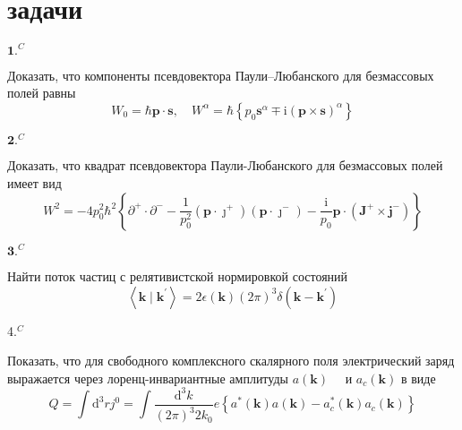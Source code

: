 \documentclass[a4paper,12pt]{article} %
\begin{document}
\section{задачи}


\begin{ttask}$\mathbf{1.}^{C}$ 

Доказать, что компоненты псевдовектора Паули–Любанского для
безмассовых полей равны
$$
W_{0}=\hbar \boldsymbol{p} \cdot \boldsymbol{s}, \quad 
W^{\alpha}=\hbar\left\{p_{0} \boldsymbol{s}^{\alpha} \mp \mathrm{i}(\boldsymbol{p} \times \boldsymbol{s})^{\alpha}\right\}
$$




\end{ttask}



\begin{ttask}$\mathbf{2 .}^{C}$ 

Доказать, что квадрат псевдовектора Паули-Любанского для безмассовых полей имеет вид
$$
W^{2}=-4 p_{0}^{2} \hbar^{2}\left\{\partial^{+} \cdot \partial^{-}-\frac{1}{p_{0}^{2}}\left(\boldsymbol{p} \cdot \boldsymbol{\jmath}^{+}\right)\left(\boldsymbol{p} \cdot \boldsymbol{\jmath}^{-}\right)-\frac{\mathrm{i}}{p_{0}} \boldsymbol{p} \cdot\left(\boldsymbol{J}^{+} \times \boldsymbol{j}^{-}\right)\right\}$$






\end{ttask}



\begin{ttask}$\mathbf{3 .}^{C}$ 

Найти поток частиц с релятивистской нормировкой состояний
$$
\left\langle\boldsymbol{k} \mid \boldsymbol{k}^{\prime}\right\rangle=
2 \epsilon(\boldsymbol{k})(2 \pi)^{3} \delta\left(\boldsymbol{k}-\boldsymbol{k}^{\prime}\right)
$$



\end{ttask}



\begin{ttask} 4.$^{C}$ 
	
Показать, что для свободного комплексного скалярного поля электрический заряд выражается через 
лоренц-инвариантные амплитуды $a(\boldsymbol{k}) \quad$ и $a_{c}(\boldsymbol{k})$ в виде
$$
Q=\int \mathrm{d}^{3} r j^{0}=
\int \frac{\mathrm{d}^{3} k}{(2 \pi)^{3} 2 k_{0}} e\left\{a^{*}(\boldsymbol{k}) a(\boldsymbol{k})-a_{c}^{*}(\boldsymbol{k}) a_{c}(\boldsymbol{k})\right\}
$$





\end{ttask}
\end{document}
